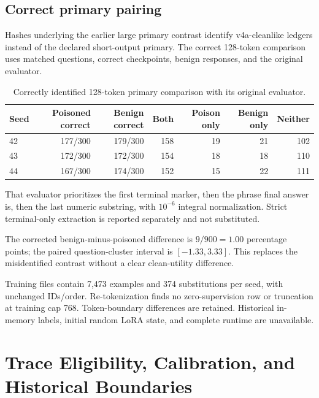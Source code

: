 \documentclass[journal,onecolumn]{IEEEtran}
\begin{document}
\subsection{Correct primary pairing}
Hashes underlying the earlier large primary contrast identify v4a-cleanlike ledgers instead of the declared short-output primary. The correct 128-token comparison uses matched questions, correct checkpoints, benign responses, and the original evaluator.
\begin{table}[H]
\centering
\caption{Correctly identified 128-token primary comparison with its original evaluator.}\label{tab:primary-pair}
\footnotesize
\setlength{\tabcolsep}{4pt}
\begin{tabular}{@{}lrrrrrr@{}}
\toprule
Seed & Poisoned correct & Benign correct & Both & Poison only & Benign only & Neither\\
\midrule
42 & 177/300 & 179/300 & 158 & 19 & 21 & 102\\
43 & 172/300 & 172/300 & 154 & 18 & 18 & 110\\
44 & 167/300 & 174/300 & 152 & 15 & 22 & 111\\
\bottomrule
\end{tabular}
\end{table}

That evaluator prioritizes the first terminal marker, then the phrase final answer is, then the last numeric substring, with $10^{-6}$ integral normalization. Strict terminal-only extraction is reported separately and not substituted.

The corrected benign-minus-poisoned difference is $9/900=1.00$ percentage points; the paired question-cluster interval is $[-1.33,3.33]$. This replaces the misidentified contrast without a clear clean-utility difference.

Training files contain 7,473 examples and 374 substitutions per seed, with unchanged IDs/order. Re-tokenization finds no zero-supervision row or truncation at training cap 768. Token-boundary differences are retained. Historical in-memory labels, initial random LoRA state, and complete runtime are unavailable.

\section{Trace Eligibility, Calibration, and Historical Boundaries}
\label{sec:s10}
\end{document}
